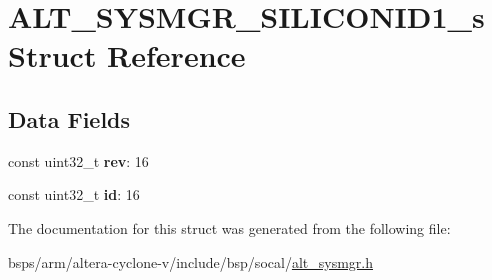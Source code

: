\hypertarget{structALT__SYSMGR__SILICONID1__s}{}\section{A\+L\+T\+\_\+\+S\+Y\+S\+M\+G\+R\+\_\+\+S\+I\+L\+I\+C\+O\+N\+I\+D1\+\_\+s Struct Reference}
\label{structALT__SYSMGR__SILICONID1__s}
\subsection*{Data Fields}
\begin{DoxyCompactItemize}
\item 
\mbox{\label{structALT__SYSMGR__SILICONID1__s_a746ea57b5a12686c827c41ffe040ab87}} 
const uint32\+\_\+t {\bfseries rev}\+: 16
\item 
\mbox{\label{structALT__SYSMGR__SILICONID1__s_a60227c9d36181f22d2d540b4fdbf4789}} 
const uint32\+\_\+t {\bfseries id}\+: 16
\end{DoxyCompactItemize}


The documentation for this struct was generated from the following file\+:\begin{DoxyCompactItemize}
\item 
bsps/arm/altera-\/cyclone-\/v/include/bsp/socal/\mbox{\hyperlink{alt__sysmgr_8h}{alt\+\_\+sysmgr.\+h}}\end{DoxyCompactItemize}
